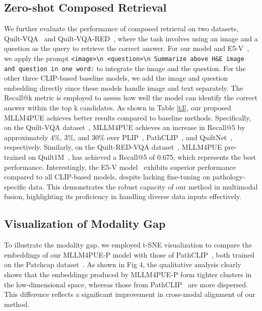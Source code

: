\subsection{Zero-shot Composed Retrieval}
We further evaluate the performance of composed retrieval on two datasets, Quilt-VQA~\cite{seyfioglu2024quilt} and Quilt-VQA-RED~\cite{seyfioglu2024quilt}, where the task involves using an image and a question as the query to retrieve the correct answer. For our model and E5-V~\cite{jiang2024e5}, we apply the prompt \texttt{<image>\textbackslash n <question>\textbackslash n Summarize above H\&E image and question in one word:} to integrate the image and the question. For the other three CLIP-based baseline models, we add the image and question embedding directly since these models handle image and text separately. The Recall@k metric is employed to assess how well the model can identify the correct answer within the top k candidates.
As shown in Table \ref{t3}, our proposed MLLM4PUE achieves better results compared to baseline methods. Specifically, on the Quilt-VQA dataset~\cite{seyfioglu2024quilt}, MLLM4PUE achieves an increase in Recall@5 by approximately 4\%, 3\%, and 30\% over PLIP~\cite{huang2023visual}, PathCLIP~\cite{sun2024pathasst}, and QuiltNet~\cite{ikezogwo2024quilt}, respectively. Similarly, on the Quilt-RED-VQA dataset~\cite{seyfioglu2024quilt}, MLLM4PUE pre-trained on Quilt1M~\cite{ikezogwo2024quilt}, has achieved a Recall@5 of 0.675, which represents the best performance. Interestingly, the E5-V model~\cite{jiang2024e5} exhibits superior performance compared to all CLIP-based models, despite lacking fine-tuning on pathology-specific data. This demonstrates the robust capacity of our method in multimodal fusion, highlighting its proficiency in handling diverse data inputs effectively.

\subsection{Visualization of Modality Gap}
To illustrate the modality gap, we employed t-SNE visualization to compare the embeddings of our MLLM4PUE-P model with those of PathCLIP~\cite{sun2024pathasst}, both trained on the Patchcap dataset~\cite{sun2024pathasst}. As shown in Fig 4, the qualitative analysis clearly shows that the embeddings produced by MLLM4PUE-P form tighter clusters in the low-dimensional space, whereas those from PathCLIP~\cite{sun2024pathasst} are more dispersed. This difference reflects a significant improvement in cross-modal alignment of our method.


